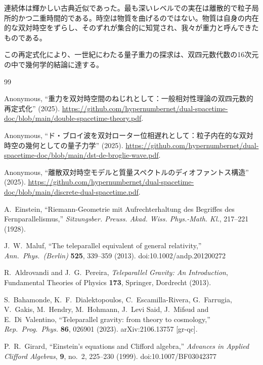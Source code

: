 \documentclass[a4paper]{article}
\begin{document}
連続体は輝かしい古典近似であった。最も深いレベルでの実在は離散的で粒子局所的かつ二重時間的である。時空は物質を曲げるのではない。物質は自身の内在的な双対時空をずらし、そのずれが集合的に知覚され、我々が重力と呼んできたものである。

この再定式化により、一世紀にわたる量子重力の探求は、双四元数代数の16次元の中で幾何学的結論に達する。


\begin{thebibliography}{99}
\raggedright

Anonymous,
``重力を双対時空間のねじれとして：一般相対性理論の双四元数的再定式化'' (2025).
\url{https://github.com/hypernumbernet/dual-spacetime-doc/blob/main/double-spacetime-theory.pdf}.

Anonymous,
``ド・ブロイ波を双対ローター位相遅れとして：粒子内在的な双対時空の幾何としての量子力学'' (2025).
\url{https://github.com/hypernumbernet/dual-spacetime-doc/blob/main/dst-de-broglie-wave.pdf}.

Anonymous,
``離散双対時空モデルと質量スペクトルのディオファントス構造'' (2025).
\url{https://github.com/hypernumbernet/dual-spacetime-doc/blob/main/discrete-dual-spacetime.pdf}.

A.~Einstein,
``Riemann-Geometrie mit Aufrechterhaltung des Begriffes des Fernparallelismus,''
\textit{Sitzungsber. Preuss. Akad. Wiss. Phys.-Math. Kl.},
217--221 (1928).

J.~W.~Maluf,
``The teleparallel equivalent of general relativity,''
\textit{Ann.\ Phys.\ (Berlin)} \textbf{525}, 339--359 (2013).
doi:10.1002/andp.201200272

R.~Aldrovandi and J.~G.~Pereira,
\textit{Teleparallel Gravity: An Introduction},
Fundamental Theories of Physics \textbf{173},
Springer, Dordrecht (2013).

S.~Bahamonde, K.~F.~Dialektopoulos, C.~Escamilla-Rivera, G.~Farrugia, V.~Gakis, M.~Hendry, M.~Hohmann, J.~Levi Said, J.~Mifsud and E.~Di~Valentino,
``Teleparallel gravity: from theory to cosmology,''
\textit{Rep.\ Prog.\ Phys.} \textbf{86}, 026901 (2023).
arXiv:2106.13757 [gr-qc].

P.~R.~Girard,
``Einstein's equations and Clifford algebra,''
\textit{Advances in Applied Clifford Algebras},
\textbf{9}, no.~2, 225--230 (1999).
doi:10.1007/BF03042377


\end{thebibliography}
\end{document}
